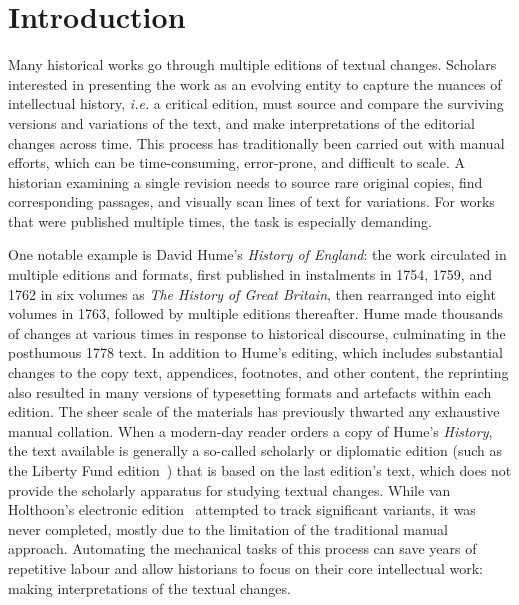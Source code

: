 \documentclass[sigconf,natbib,anonymous]{acmart}
\begin{document}

\maketitle

\section{Introduction}

Many historical works go through multiple editions of textual changes.
Scholars interested in presenting the work as an evolving entity to capture the nuances of intellectual history, \textit{i.e.} a critical edition, must source and compare the surviving versions and variations of the text, and make interpretations of the editorial changes across time.
This process has traditionally been carried out with manual efforts, which can be time-consuming, error-prone, and difficult to scale.
A historian examining a single revision needs to source rare original copies, find corresponding passages, and visually scan lines of text for variations.
For works that were published multiple times, the task is especially demanding.

One notable example is David Hume's \emph{History of England}: the work circulated in multiple editions and formats, first published in instalments in 1754, 1759, and 1762 in six volumes as \emph{The History of Great Britain}, then rearranged into eight volumes in 1763, followed by multiple editions thereafter.
Hume made thousands of changes at various times in response to historical discourse, culminating in the posthumous 1778 text.
In addition to Hume's editing, which includes substantial changes to the copy text, appendices, footnotes, and other content, the reprinting also resulted in many versions of typesetting formats and artefacts within each edition.
The sheer scale of the materials has previously thwarted any exhaustive manual collation.
When a modern-day reader orders a copy of Hume's \emph{History}, the text available is generally a so-called scholarly or diplomatic edition (such as the Liberty Fund edition~\cite{hume1983liberty}) that is based on the last edition's text, which does not provide the scholarly apparatus for studying textual changes.
While van Holthoon's electronic edition~\cite{vanholthoon2000} attempted to track significant variants, it was never completed, mostly due to the limitation of the traditional manual approach.
Automating the mechanical tasks of this process can save years of repetitive labour and allow historians to focus on their core intellectual work: making interpretations of the textual changes.
\end{document}
